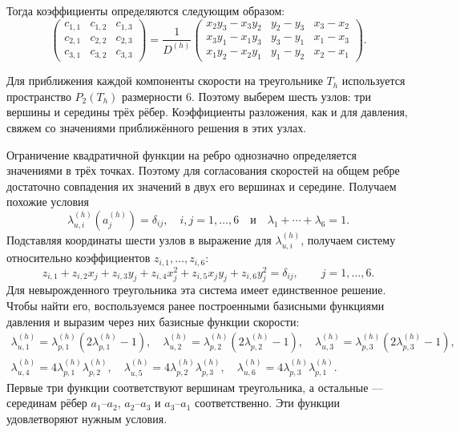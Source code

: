 \documentclass[a4paper,14pt]{extarticle}
\begin{document}
Тогда коэффициенты определяются следующим образом:
	\begin{equation}
		\begin{pmatrix}
			c_{1,1} & c_{1,2} & c_{1,3}\\
			c_{2,1} & c_{2,2} & c_{2,3}\\
			c_{3,1} & c_{3,2} & c_{3,3}
		\end{pmatrix}
		=
		\frac{1}{D^{(h)}}
		\begin{pmatrix}
			x_2y_3-x_3y_2 & y_2-y_3 & x_3-x_2\\
			x_3y_1-x_1y_3 & y_3-y_1 & x_1-x_3\\
			x_1y_2-x_2y_1 & y_1-y_2 & x_2-x_1
		\end{pmatrix}.
	\end{equation}

	Для приближения каждой компоненты скорости на треугольнике
	$T_h$ используется пространство $P_2(T_h)$ размерности 6.
	Поэтому выберем шесть узлов: три вершины и середины трёх
	рёбер. Коэффициенты разложения, как и для давления, свяжем
	со значениями приближённого решения в этих узлах.

	Ограничение квадратичной функции на ребро однозначно
	определяется значениями в трёх точках. Поэтому для
	согласования скоростей на общем ребре достаточно совпадения
	их значений в двух его вершинах и середине. Получаем похожие условия
	\begin{equation}
	\lambda_{u,i}^{(h)}\left(a_j^{(h)}\right)
	=
	\delta_{ij},
	\quad i,j=1,\ldots,6 \quad \text{и} \quad
	\lambda_1 + \cdots + \lambda_6 = 1.
	\end{equation}
	Подставляя координаты шести узлов в выражение для
$\lambda_{u,i}^{(h)}$, получаем систему относительно
коэффициентов $z_{i,1},\ldots,z_{i,6}$:
\begin{equation}
	z_{i,1}+z_{i,2}x_j+z_{i,3}y_j
	+z_{i,4}x_j^2+z_{i,5}x_jy_j+z_{i,6}y_j^2
	=
	\delta_{ij},
	\qquad j=1,\ldots,6.
\end{equation}
Для невырожденного треугольника эта система имеет
единственное решение. Чтобы найти его, воспользуемся
ранее построенными базисными функциями давления и выразим
через них базисные функции скорости:
\begin{equation}
	\begin{gathered}
		\lambda_{u,1}^{(h)}
		=
		\lambda_{p,1}^{(h)}
		\left(2\lambda_{p,1}^{(h)}-1\right),
		\quad
		\lambda_{u,2}^{(h)}
		=
		\lambda_{p,2}^{(h)}
		\left(2\lambda_{p,2}^{(h)}-1\right),
		\quad
		\lambda_{u,3}^{(h)}
		=
		\lambda_{p,3}^{(h)}
		\left(2\lambda_{p,3}^{(h)}-1\right),
		\\[6pt]
		\lambda_{u,4}^{(h)}
		=
		4\lambda_{p,1}^{(h)}\lambda_{p,2}^{(h)},
		\quad
		\lambda_{u,5}^{(h)}
		=
		4\lambda_{p,2}^{(h)}\lambda_{p,3}^{(h)},
		\quad
		\lambda_{u,6}^{(h)}
		=
		4\lambda_{p,3}^{(h)}\lambda_{p,1}^{(h)}.
	\end{gathered}
\end{equation}
Первые три функции соответствуют вершинам треугольника,
а остальные --- серединам рёбер $a_1$--$a_2$, $a_2$--$a_3$ и
$a_3$--$a_1$ соответственно. Эти функции удовлетворяют нужным
условия.
\end{document}
